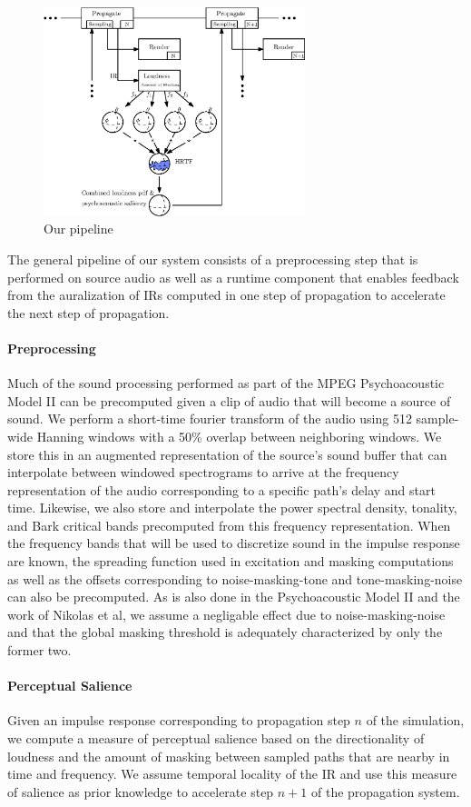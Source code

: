 \begin{figure}
  \centerline{\includegraphics[width=3.0in]{figs/figure1}}
  \caption{Our pipeline}
  \label{fig:figure1}
\end{figure}

The general pipeline of our system consists of a preprocessing step that is performed on source audio
as well as a runtime component that enables feedback from the auralization of IRs computed in one step of 
propagation to accelerate the next step of propagation.
\paragraph{Preprocessing}
Much of the sound processing performed as part of the MPEG Psychoacoustic Model II can be precomputed 
given a clip of audio that will become a source of sound.
We perform a short-time fourier transform of the audio using 512 sample-wide Hanning windows with a 
50\% overlap between neighboring windows.
We store this in an augmented representation of the source's sound buffer that can interpolate between 
windowed spectrograms to arrive at the frequency representation of the audio corresponding to a specific 
path's delay and start time.
Likewise, we also store and interpolate the power spectral density, tonality, and Bark critical bands 
precomputed from this frequency representation.
When the frequency bands that will be used to discretize sound in the impulse response are known, the 
spreading function used in excitation and masking computations as well as the offsets corresponding 
to noise-masking-tone and tone-masking-noise can also be precomputed.
As is also done in the Psychoacoustic Model II and the work of Nikolas et al, we assume a negligable 
effect due to noise-masking-noise and that the global masking threshold is adequately characterized 
by only the former two.
\paragraph{Perceptual Salience}
Given an impulse response corresponding to propagation step $n$ of the simulation, we compute a measure 
of perceptual salience based on the directionality of loudness and the amount of masking between sampled 
paths that are nearby in time and frequency.
We assume temporal locality of the IR and use this measure of salience as prior knowledge to accelerate 
step $n+1$ of the propagation system.
